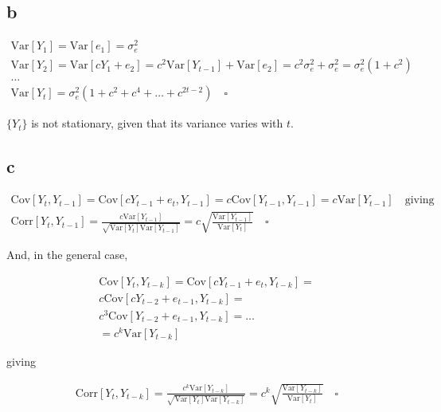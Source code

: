 \documentclass[]{book}
\begin{document}
\subsection*{b}\label{b-16}

\begin{gather*}
  \text{Var}[Y_1] = \text{Var}[e_1] = \sigma_e^2\\
  \text{Var}[Y_2] = \text{Var}[cY_{1} + e_2] = c^2\text{Var}[Y_{t-1}] + \text{Var}[e_2] = c^2\sigma_e^2 + \sigma_e^2 = \sigma_e^2(1 + c^2)\\
  \dots\\
  \text{Var}[Y_t] = \sigma_e^2(1 + c^2 + c^4 + \dots + c^{2t-2}) \quad\square
\end{gather*}

\(\{Y_t\}\) is not stationary, given that its variance varies with
\(t\).

\subsection*{c}\label{c-10}

\begin{gather*}
  \text{Cov}[Y_t, Y_{t-1}] = \text{Cov}[cY_{t-1} + e_t, Y_{t-1}] = c\text{Cov}[Y_{t-1}, Y_{t-1}] = c\text{Var}[Y_{t-1}]\quad \text{giving}\\
  \text{Corr}[Y_t, Y_{t-1}] = \frac{c\text{Var}[Y_{t-1}]}{\sqrt{\text{Var}[Y_t]\text{Var}[Y_{t-1}]}} =
    c \sqrt{\frac{\text{Var}[Y_{t-1}]}{\text{Var}[Y_t]}}\quad\square
\end{gather*}

And, in the general case,

\begin{gather*}
  \text{Cov}[Y_t, Y_{t-k}] = \text{Cov}[cY_{t-1}+e_t, Y_{t-k}] = \\
  c\text{Cov}[cY_{t-2} + e_{t-1}, Y_{t-k}] =\\
  c^3\text{Cov}[Y_{t-2} + e_{t-1}, Y_{t-k}] = \dots\\ = c^k\text{Var}[Y_{t-k}]
\end{gather*}

giving

\begin{gather*}
  \text{Corr}[Y_t, Y_{t-k}] = \frac{c^k\text{Var}[Y_{t-k}]}{\sqrt{\text{Var}[Y_t]\text{Var}[Y_{t-k}]}} =
    c^k \sqrt{\frac{\text{Var}[Y_{t-k}]}{\text{Var}[Y_t]}}\quad\square
\end{gather*}
\end{document}
